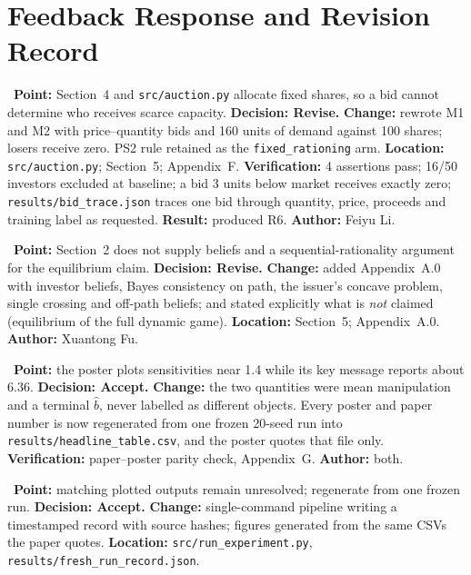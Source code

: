 \section{Feedback Response and Revision Record}
\begingroup\small
\begin{description}[leftmargin=0pt,labelsep=4pt,style=unboxed,itemsep=4pt]
\item[\textbf{Prof. Luyao Zhang, formal PS2 feedback, 14 Oct 2026}]\ \textbf{Point:} Section~4 and \texttt{src/auction.py} allocate fixed shares, so a bid cannot determine who receives scarce capacity. \textbf{Decision: Revise.} \textbf{Change:} rewrote M1 and M2 with price--quantity bids and 160 units of demand against 100 shares; losers receive zero. PS2 rule retained as the \texttt{fixed\_rationing} arm. \textbf{Location:} \texttt{src/auction.py}; Section~5; Appendix~F. \textbf{Verification:} 4 assertions pass; 16/50 investors excluded at baseline; a bid 3 units below market receives exactly zero; \texttt{results/bid\_trace.json} traces one bid through quantity, price, proceeds and training label as requested. \textbf{Result:} produced R6. \textbf{Author:} Feiyu Li.
\item[\textbf{Prof. Luyao Zhang, 14 Oct 2026}]\ \textbf{Point:} Section~2 does not supply beliefs and a sequential-rationality argument for the equilibrium claim. \textbf{Decision: Revise.} \textbf{Change:} added Appendix~A.0 with investor beliefs, Bayes consistency on path, the issuer's concave problem, single crossing and off-path beliefs; and stated explicitly what is \emph{not} claimed (equilibrium of the full dynamic game). \textbf{Location:} Section~5; Appendix~A.0. \textbf{Author:} Xuantong Fu.
\item[\textbf{Prof. Luyao Zhang, 14 Oct 2026}]\ \textbf{Point:} the poster plots sensitivities near 1.4 while its key message reports about 6.36. \textbf{Decision: Accept.} \textbf{Change:} the two quantities were mean manipulation and a terminal $\hat b$, never labelled as different objects. Every poster and paper number is now regenerated from one frozen 20-seed run into \texttt{results/headline\_table.csv}, and the poster quotes that file only. \textbf{Verification:} paper--poster parity check, Appendix~G. \textbf{Author:} both.
\item[\textbf{Prof. Luyao Zhang, 14 Oct 2026}]\ \textbf{Point:} matching plotted outputs remain unresolved; regenerate from one frozen run. \textbf{Decision: Accept.} \textbf{Change:} single-command pipeline writing a timestamped record with source hashes; figures generated from the same CSVs the paper quotes. \textbf{Location:} \texttt{src/run\_experiment.py}, \texttt{results/fresh\_run\_record.json}.

\end{description}
